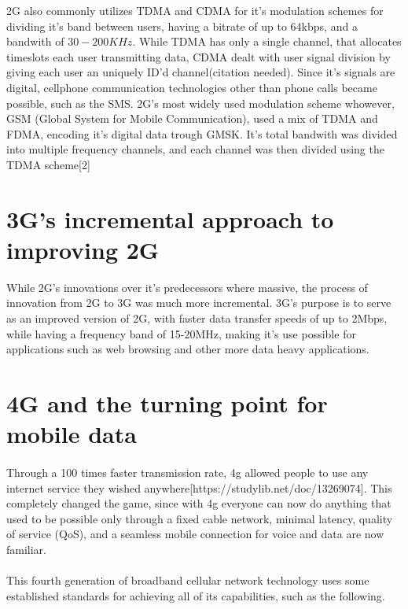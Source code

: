 \documentclass[10pt,journal,compsoc]{IEEEtran}
\begin{document}
2G also commonly utilizes TDMA and CDMA for it's modulation schemes for dividing it's band between users, having a bitrate of up to 64kbps, and a bandwith of $30-200KHz$. While TDMA has only a single channel, that allocates timeslots each user transmitting data, CDMA dealt with user signal division by giving each user an uniquely ID'd channel(citation needed). Since it's signals are digital, cellphone communication technologies other than phone calls became possible, such as the SMS. 2G's most widely used modulation scheme whowever, GSM (Global System for Mobile Communication), used a mix of TDMA and FDMA, encoding it's digital data trough GMSK. It's total bandwith was divided into multiple frequency channels, and each channel was then divided using the TDMA scheme[2]

\section{3G's incremental approach to improving 2G}
While 2G's innovations over it's predecessors where massive, the process of innovation from 2G to 3G was much more incremental. 3G's purpose is to serve as an improved version of 2G, with faster data transfer speeds of up to 2Mbps, while having a frequency band of 15-20MHz, making it's use possible for applications such as web browsing and other more data heavy applications.

\section{4G and the turning point for mobile data}

\paragraph{}
Through a 100 times faster transmission rate, 4g allowed people to use any internet service they wished anywhere[https://studylib.net/doc/13269074]. This completely changed the game, since with 4g everyone can now do anything that used to be possible only through a fixed cable network, minimal latency, quality of service (QoS), and a seamless mobile connection for voice and data are now familiar.
\paragraph{}
This fourth generation of broadband cellular network technology uses some established standards for achieving all of its capabilities, such as the following. 
\end{document}
